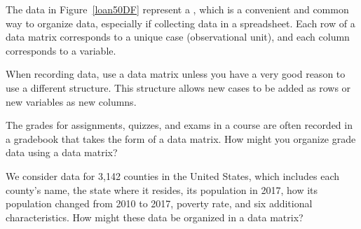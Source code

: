 
The data in Figure~\ref{loan50DF} represent a ,
which is a convenient and common way to organize data,
especially if collecting data in a spreadsheet.
Each row of a data matrix corresponds to a unique case
(observational unit),
and each column corresponds to a variable.

\D{\newpage}

When recording data, use a data matrix unless you have
a very good reason to use a different structure.
This structure allows new cases to be added as rows
or new variables as new columns.

\begin{exercisewrap}
\begin{nexercise}
The grades for assignments, quizzes, and exams in a course are
often recorded in a gradebook that takes the form of a data matrix.
How might you organize grade data using a data
matrix?\footnotemark
\end{nexercise}
\end{exercisewrap}


\begin{exercisewrap}
\begin{nexercise}\label{desc_county_as_data_matrix}%
We consider data for 3,142 counties in the United States,
which includes each county's name,
the state where it resides, its population in 2017,
how its population changed from 2010 to 2017,
poverty rate,
and six additional characteristics.
How might these data be organized in
a data matrix?\footnotemark
\end{nexercise}
\end{exercisewrap}
\addtocounter{footnote}{-1}
\addtocounter{footnote}{1}

